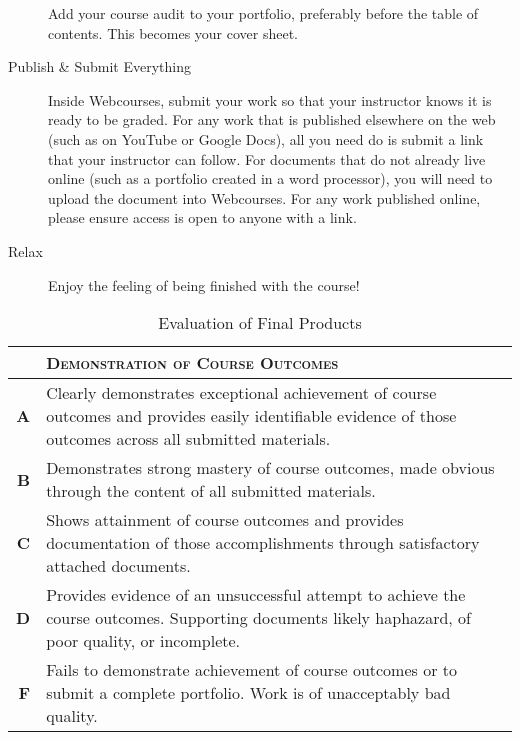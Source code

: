 \documentclass[11pt,oneside]{amsart}	%
\begin{document}
\begin{description}
	Add your course audit to your portfolio, preferably before the table of contents. This becomes your cover sheet.
	\item[Publish \& Submit Everything] Inside Webcourses, submit your work so that your instructor knows it is ready to be graded. For any work that is published elsewhere on the web (such as on YouTube or Google Docs), all you need do is submit a link that your instructor can follow. For documents that do not already live online (such as a portfolio created in a word processor), you will need to upload the document into Webcourses. For any work published online, please ensure access is open to anyone with a link.
	\item[Relax] Enjoy the feeling of being finished with the course!
\end{description}

\begin{table}[b]%
	\caption{Evaluation of Final Products}\label{tab:rubric}
\begin{tabulary}{\textwidth}{rL}
	\toprule  & \textbf{\textsc{Demonstration of Course Outcomes}} \\
\midrule	\textbf{A} & Clearly demonstrates exceptional achievement of course outcomes and provides easily identifiable evidence of those outcomes across all submitted materials. \\
\midrule	\textbf{B} & Demonstrates strong mastery of course outcomes, made obvious through the content of all submitted materials. \\
\midrule	\textbf{C} & Shows attainment of course outcomes and provides documentation of those accomplishments through satisfactory attached documents. \\
\midrule	\textbf{D} & Provides evidence of an unsuccessful attempt to achieve the course outcomes. Supporting documents likely haphazard, of poor quality, or incomplete. \\
\midrule	\textbf{F} & Fails to demonstrate achievement of course outcomes or to submit a complete portfolio. Work is of unacceptably bad quality. \\
	\bottomrule
\end{tabulary}
\end{table}
\end{document}
